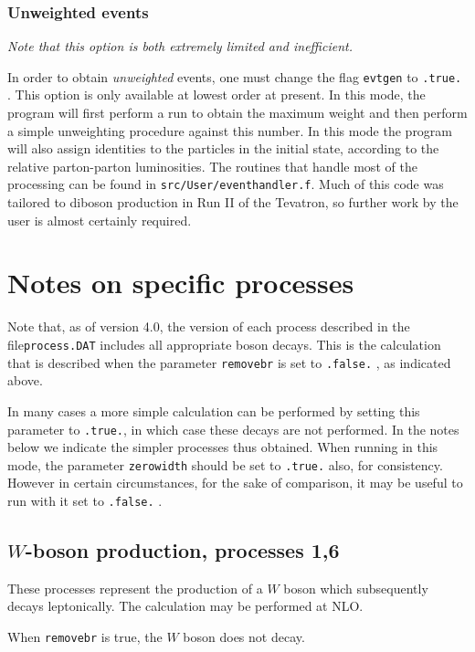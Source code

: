 \documentclass[12pt]{article}
\begin{document}
\subsubsection{Unweighted events}
{\it Note that this option is both extremely limited and inefficient.}

In order to obtain {\it unweighted} events, one must change the flag
{\tt evtgen} to {\tt .true.} . This option is only available at lowest order
at present. In this mode, the program will first perform a run to obtain the
maximum weight and then perform a simple unweighting procedure against this
number. In this mode the program will also assign identities to the
particles in the initial state, according to the relative parton-parton
luminosities. The routines that handle most of the processing can be found
in {\tt src/User/eventhandler.f}. Much of this code was tailored to diboson
production in Run II of the Tevatron, so further work by the user is almost
certainly required.

\section{Notes on specific processes}
\label{sec:specific}

Note that, as of version 4.0, the version of each process described in the file{\tt process.DAT} includes all appropriate boson decays. This is the 
calculation
that is described when the parameter {\tt removebr} is set to {\tt .false.} ,
as indicated above.

In many cases a more simple calculation can be performed by setting this
parameter to {\tt .true.}, in which case these decays are not performed. In the
notes below we indicate the simpler processes thus obtained. When running in
this mode, the parameter {\tt zerowidth} should be set to {\tt .true.} also,
for consistency. However in certain circumstances, for the sake of comparison,
it may be useful to run with it set to {\tt .false.} .

\subsection{$W$-boson production, processes 1,6}
\label{subsec:wboson}

These processes represent the production of a $W$ boson which subsequently
decays leptonically. The calculation may be performed at NLO.

When {\tt removebr} is true, the $W$ boson does not decay.
\end{document}
